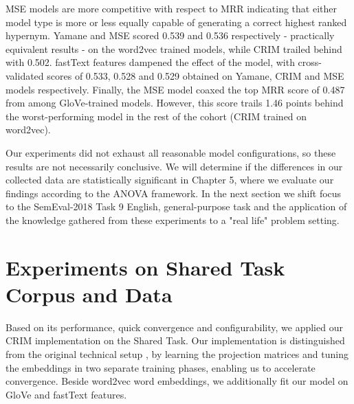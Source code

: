 \ac{MSE} models are more competitive with respect to \ac{MRR} indicating that either model type is more or less equally capable of generating a correct highest ranked hypernym.  Yamane and MSE scored 0.539 and 0.536 respectively - practically equivalent results - on the word2vec trained models, while CRIM trailed behind with 0.502.  fastText features dampened the effect of the model, with cross-validated scores of 0.533, 0.528 and 0.529 obtained on Yamane, CRIM and MSE models respectively.  Finally, the MSE model coaxed the top \ac{MRR} score of 0.487 from among GloVe-trained models.  However, this score trails 1.46 points behind the worst-performing model in the rest of the cohort (CRIM trained on word2vec).

Our experiments did not exhaust all reasonable model configurations, so these results are not necessarily conclusive.  We will determine if the differences in our collected data are statistically significant in Chapter 5, where we evaluate our findings according to the \ac{ANOVA} framework.  In the next section we shift focus to the SemEval-2018 Task 9 English, general-purpose task and the application of the knowledge gathered from these experiments to a "real life" problem setting.

\section{Experiments on Shared Task Corpus and Data}
Based on its performance, quick convergence and configurability, we applied our CRIM implementation on the Shared Task.  Our implementation is distinguished from the original technical setup \citep{bernier2018crim}, by learning the projection matrices and tuning the embeddings in two separate training phases, enabling us to accelerate convergence.  Beside word2vec word embeddings, we additionally fit our model on GloVe and fastText features.

